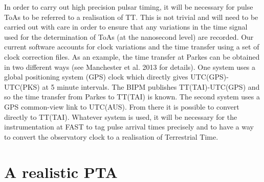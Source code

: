 \documentclass{raa}            %
\begin{document}
In order to carry out high precision pulsar timing, it will be necessary for pulse ToAs to be referred to a realisation of TT.  This is not trivial and will need to be carried out with care in order to ensure that any variations in the time signal used for the determination of ToAs (at the nanosecond level) are recorded.  Our current software accounts for clock variations and the time transfer using a set of clock correction files.  As an example, the time transfer at Parkes can be obtained in two different ways (see Manchester et al. 2013 for details).  One system uses a global positioning system (GPS) clock which directly gives UTC(GPS)-UTC(PKS) at 5 minute intervals.  The BIPM publishes TT(TAI)-UTC(GPS) and so the time transfer from Parkes to TT(TAI) is known.  The second system uses a GPS common-view link to UTC(AUS).  From there it is possible to convert directly to TT(TAI).  Whatever system is used, it will be necessary for the instrumentation at FAST to tag pulse arrival times precisely and to have a way to convert the observatory clock to a realisation of Terrestrial Time.

\section{A realistic PTA}\label{sec:realistic}
\end{document}
